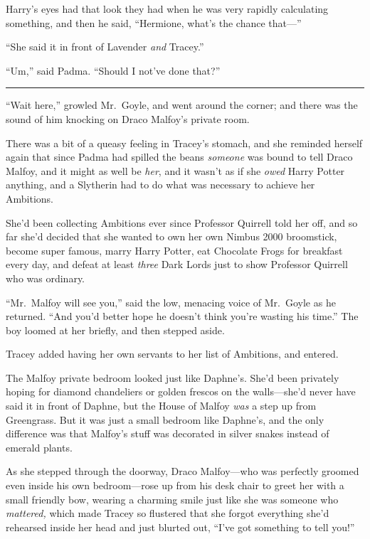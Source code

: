 Harry's eyes had that look they had when he was very rapidly calculating
something, and then he said, ``Hermione, what's the chance that---''

``She said it in front of Lavender \emph{and} Tracey.''

``Um,'' said Padma. ``Should I not've done that?''

\begin{center}\rule{3in}{0.4pt}\end{center}

``Wait here,'' growled Mr.~Goyle, and went around the corner; and there
was the sound of him knocking on Draco Malfoy's private room.

There was a bit of a queasy feeling in Tracey's stomach, and she
reminded herself again that since Padma had spilled the beans
\emph{someone} was bound to tell Draco Malfoy, and it might as well be
\emph{her}, and it wasn't as if she \emph{owed} Harry Potter anything,
and a Slytherin had to do what was necessary to achieve her Ambitions.

She'd been collecting Ambitions ever since Professor Quirrell told her
off, and so far she'd decided that she wanted to own her own Nimbus 2000
broomstick, become super famous, marry Harry Potter, eat Chocolate Frogs
for breakfast every day, and defeat at least \emph{three} Dark Lords
just to show Professor Quirrell who was ordinary.

``Mr.~Malfoy will see you,'' said the low, menacing voice of Mr.~Goyle
as he returned. ``And you'd better hope he doesn't think you're wasting
his time.'' The boy loomed at her briefly, and then stepped aside.

Tracey added having her own servants to her list of Ambitions, and
entered.

The Malfoy private bedroom looked just like Daphne's. She'd been
privately hoping for diamond chandeliers or golden frescos on the
walls---she'd never have said it in front of Daphne, but the House of
Malfoy \emph{was} a step up from Greengrass. But it was just a small
bedroom like Daphne's, and the only difference was that Malfoy's stuff
was decorated in silver snakes instead of emerald plants.

As she stepped through the doorway, Draco Malfoy---who was perfectly
groomed even inside his own bedroom---rose up from his desk chair to
greet her with a small friendly bow, wearing a charming smile just like
she was someone who \emph{mattered,} which made Tracey so flustered that
she forgot everything she'd rehearsed inside her head and just blurted
out, ``I've got something to tell you!''

